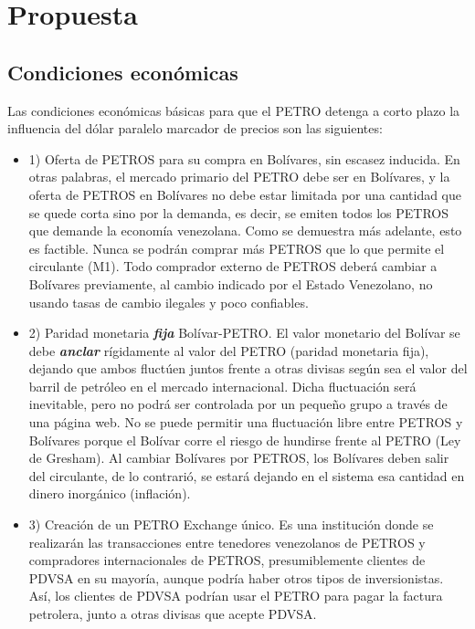 %
\section{Propuesta}
\label{sec:proposal}
%
\subsection{Condiciones económicas}
\label{sec:overview}
%
Las condiciones económicas básicas para que el PETRO detenga a corto plazo la influencia del dólar paralelo marcador de precios son las siguientes:
\begin{itemize}
\item{1)} Oferta de PETROS para su compra en Bolívares, sin escasez inducida. En otras palabras, el mercado primario del PETRO debe ser en Bolívares, y la oferta de PETROS en Bolívares no debe estar limitada por una cantidad que se quede corta sino por la demanda, es decir, se emiten todos los PETROS que demande la economía venezolana. Como se demuestra más adelante, esto es factible. Nunca se podrán comprar más PETROS que lo que permite el circulante (M1). Todo comprador externo de PETROS deberá cambiar a Bolívares previamente, al cambio indicado por el Estado Venezolano, no usando tasas de cambio ilegales y poco confiables.
%
\item{2)} Paridad monetaria {\bf{\it fija}} Bolívar-PETRO. El valor monetario del Bolívar se debe {\bf{\it anclar}} rígidamente al valor del PETRO (paridad monetaria fija), dejando que ambos fluctúen juntos frente a otras divisas según sea el valor del barril de petróleo en el mercado internacional. Dicha fluctuación será inevitable, pero no podrá ser controlada por un pequeño grupo a través de una página web. No se puede permitir una fluctuación libre entre PETROS y Bolívares porque el Bolívar corre el riesgo de hundirse frente al PETRO (Ley de Gresham). Al cambiar Bolívares por PETROS, los Bolívares deben salir del circulante, de lo contrarió, se estará dejando en el sistema esa cantidad en dinero inorgánico (inflación).
%   
\item{3)} Creación de un PETRO Exchange único. Es una institución donde se realizarán las transacciones entre tenedores venezolanos de PETROS y compradores internacionales de PETROS, presumiblemente clientes de PDVSA en su mayoría, aunque podría haber otros tipos de inversionistas. Así, los clientes de PDVSA podrían usar el PETRO para pagar la factura petrolera, junto a otras divisas que acepte PDVSA.
\end{itemize}
